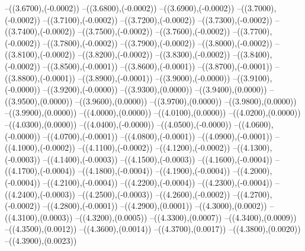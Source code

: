 {	--({\sx*(3.6700)},{\sy*(-0.0002)})
	--({\sx*(3.6800)},{\sy*(-0.0002)})
	--({\sx*(3.6900)},{\sy*(-0.0002)})
	--({\sx*(3.7000)},{\sy*(-0.0002)})
	--({\sx*(3.7100)},{\sy*(-0.0002)})
	--({\sx*(3.7200)},{\sy*(-0.0002)})
	--({\sx*(3.7300)},{\sy*(-0.0002)})
	--({\sx*(3.7400)},{\sy*(-0.0002)})
	--({\sx*(3.7500)},{\sy*(-0.0002)})
	--({\sx*(3.7600)},{\sy*(-0.0002)})
	--({\sx*(3.7700)},{\sy*(-0.0002)})
	--({\sx*(3.7800)},{\sy*(-0.0002)})
	--({\sx*(3.7900)},{\sy*(-0.0002)})
	--({\sx*(3.8000)},{\sy*(-0.0002)})
	--({\sx*(3.8100)},{\sy*(-0.0002)})
	--({\sx*(3.8200)},{\sy*(-0.0002)})
	--({\sx*(3.8300)},{\sy*(-0.0002)})
	--({\sx*(3.8400)},{\sy*(-0.0002)})
	--({\sx*(3.8500)},{\sy*(-0.0001)})
	--({\sx*(3.8600)},{\sy*(-0.0001)})
	--({\sx*(3.8700)},{\sy*(-0.0001)})
	--({\sx*(3.8800)},{\sy*(-0.0001)})
	--({\sx*(3.8900)},{\sy*(-0.0001)})
	--({\sx*(3.9000)},{\sy*(-0.0000)})
	--({\sx*(3.9100)},{\sy*(-0.0000)})
	--({\sx*(3.9200)},{\sy*(-0.0000)})
	--({\sx*(3.9300)},{\sy*(0.0000)})
	--({\sx*(3.9400)},{\sy*(0.0000)})
	--({\sx*(3.9500)},{\sy*(0.0000)})
	--({\sx*(3.9600)},{\sy*(0.0000)})
	--({\sx*(3.9700)},{\sy*(0.0000)})
	--({\sx*(3.9800)},{\sy*(0.0000)})
	--({\sx*(3.9900)},{\sy*(0.0000)})
	--({\sx*(4.0000)},{\sy*(0.0000)})
	--({\sx*(4.0100)},{\sy*(0.0000)})
	--({\sx*(4.0200)},{\sy*(0.0000)})
	--({\sx*(4.0300)},{\sy*(0.0000)})
	--({\sx*(4.0400)},{\sy*(-0.0000)})
	--({\sx*(4.0500)},{\sy*(-0.0000)})
	--({\sx*(4.0600)},{\sy*(-0.0000)})
	--({\sx*(4.0700)},{\sy*(-0.0001)})
	--({\sx*(4.0800)},{\sy*(-0.0001)})
	--({\sx*(4.0900)},{\sy*(-0.0001)})
	--({\sx*(4.1000)},{\sy*(-0.0002)})
	--({\sx*(4.1100)},{\sy*(-0.0002)})
	--({\sx*(4.1200)},{\sy*(-0.0002)})
	--({\sx*(4.1300)},{\sy*(-0.0003)})
	--({\sx*(4.1400)},{\sy*(-0.0003)})
	--({\sx*(4.1500)},{\sy*(-0.0003)})
	--({\sx*(4.1600)},{\sy*(-0.0004)})
	--({\sx*(4.1700)},{\sy*(-0.0004)})
	--({\sx*(4.1800)},{\sy*(-0.0004)})
	--({\sx*(4.1900)},{\sy*(-0.0004)})
	--({\sx*(4.2000)},{\sy*(-0.0004)})
	--({\sx*(4.2100)},{\sy*(-0.0004)})
	--({\sx*(4.2200)},{\sy*(-0.0004)})
	--({\sx*(4.2300)},{\sy*(-0.0004)})
	--({\sx*(4.2400)},{\sy*(-0.0003)})
	--({\sx*(4.2500)},{\sy*(-0.0003)})
	--({\sx*(4.2600)},{\sy*(-0.0002)})
	--({\sx*(4.2700)},{\sy*(-0.0002)})
	--({\sx*(4.2800)},{\sy*(-0.0001)})
	--({\sx*(4.2900)},{\sy*(0.0001)})
	--({\sx*(4.3000)},{\sy*(0.0002)})
	--({\sx*(4.3100)},{\sy*(0.0003)})
	--({\sx*(4.3200)},{\sy*(0.0005)})
	--({\sx*(4.3300)},{\sy*(0.0007)})
	--({\sx*(4.3400)},{\sy*(0.0009)})
	--({\sx*(4.3500)},{\sy*(0.0012)})
	--({\sx*(4.3600)},{\sy*(0.0014)})
	--({\sx*(4.3700)},{\sy*(0.0017)})
	--({\sx*(4.3800)},{\sy*(0.0020)})
	--({\sx*(4.3900)},{\sy*(0.0023)})
}
